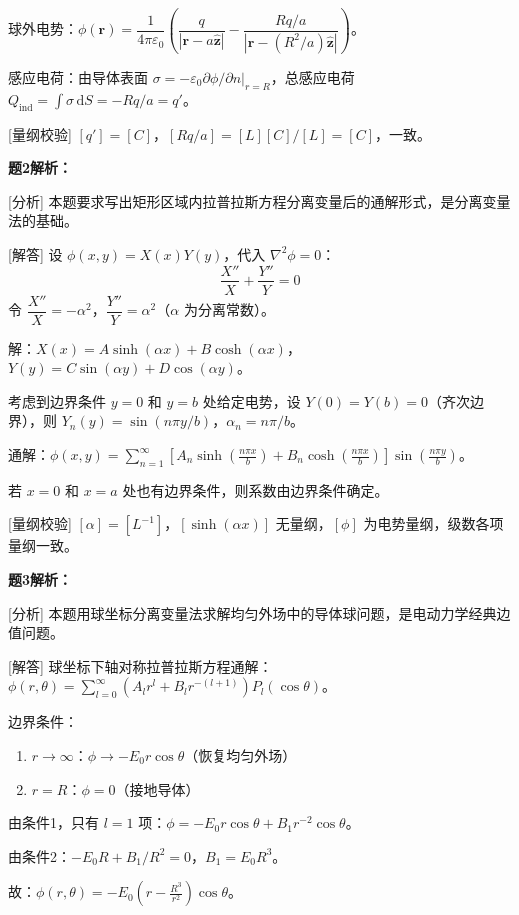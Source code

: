 \documentclass[11pt,a4paper,openany,oneside]{book}
\newcommand{\diff}{\mathrm{d}}
\newcommand{\eps}{\varepsilon}
\newcommand{\vect}[1]{\bm{#1}}
\newcommand{\unitvec}[1]{\hat{\vect{#1}}}
\newcommand{\lap}{\nabla^2}
\begin{document}
球外电势：$\phi(\vect{r}) = \dfrac{1}{4\pi\eps_0}\left(\dfrac{q}{|\vect{r}-a\unitvec{z}|} - \dfrac{Rq/a}{|\vect{r}-(R^2/a)\unitvec{z}|}\right)$。

感应电荷：由导体表面 $\sigma = -\eps_0\partial\phi/\partial n|_{r=R}$，总感应电荷 $Q_{\text{ind}} = \int\sigma\,\diff S = -Rq/a = q'$。\qedsymbol

[量纲校验] $[q'] = [C]$，$[Rq/a] = [L][C]/[L] = [C]$，一致。\qedsymbol

\textbf{题2解析：}

[分析] 本题要求写出矩形区域内拉普拉斯方程分离变量后的通解形式，是分离变量法的基础。

[解答] 设 $\phi(x,y) = X(x)Y(y)$，代入 $\lap\phi = 0$：
\[
\frac{X''}{X} + \frac{Y''}{Y} = 0
\]
令 $\dfrac{X''}{X} = -\alpha^2$，$\dfrac{Y''}{Y} = \alpha^2$（$\alpha$ 为分离常数）。

解：$X(x) = A\sinh(\alpha x) + B\cosh(\alpha x)$，$Y(y) = C\sin(\alpha y) + D\cos(\alpha y)$。

考虑到边界条件 $y=0$ 和 $y=b$ 处给定电势，设 $Y(0) = Y(b) = 0$（齐次边界），则 $Y_n(y) = \sin(n\pi y/b)$，$\alpha_n = n\pi/b$。

通解：$\phi(x,y) = \sum_{n=1}^{\infty}\left[A_n\sinh\left(\frac{n\pi x}{b}\right) + B_n\cosh\left(\frac{n\pi x}{b}\right)\right]\sin\left(\frac{n\pi y}{b}\right)$。

若 $x=0$ 和 $x=a$ 处也有边界条件，则系数由边界条件确定。\qedsymbol

[量纲校验] $[\alpha] = [L^{-1}]$，$[\sinh(\alpha x)]$ 无量纲，$[\phi]$ 为电势量纲，级数各项量纲一致。\qedsymbol

\textbf{题3解析：}

[分析] 本题用球坐标分离变量法求解均匀外场中的导体球问题，是电动力学经典边值问题。

[解答] 球坐标下轴对称拉普拉斯方程通解：$\phi(r,\theta) = \sum_{l=0}^{\infty}(A_l r^l + B_l r^{-(l+1)})P_l(\cos\theta)$。

边界条件：
\begin{enumerate}
\item $r \to \infty$：$\phi \to -E_0 r\cos\theta$（恢复均匀外场）
\item $r = R$：$\phi = 0$（接地导体）
\end{enumerate}

由条件1，只有 $l=1$ 项：$\phi = -E_0 r\cos\theta + B_1 r^{-2}\cos\theta$。

由条件2：$-E_0 R + B_1/R^2 = 0$，$B_1 = E_0 R^3$。

故：$\phi(r,\theta) = -E_0\left(r - \frac{R^3}{r^2}\right)\cos\theta$。
\end{document}
